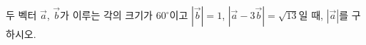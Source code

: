 두 벡터 $\vec{a}$, $\vec{b}$가 이루는 각의 크기가 $60^\circ$이고 $|\vec{b}|=1$, $|\vec{a}-3\vec{b}|=\sqrt{13}$일 때, $|\vec{a}|$를 구하시오.
